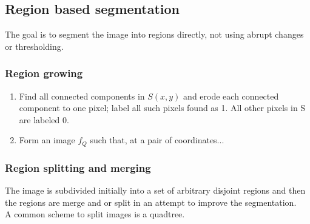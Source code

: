 \subsection{Region based segmentation}
The goal is to segment the image into regions directly, not using abrupt changes or thresholding.
\subsubsection{Region growing}
\begin{enumerate}
\item Find all connected components in $S(x,y)$ and erode each connected component to one pixel; label all such pixels found as 1. All other pixels in S are labeled 0.
\item Form an image $f_Q$ such that, at a pair of coordinates...
\end{enumerate}
\subsubsection{Region splitting and merging}
The image is subdivided initially into a set of arbitrary disjoint regions and then the regions are merge and or split in an attempt to improve the segmentation.\\
A common scheme to split images is a quadtree.\\
